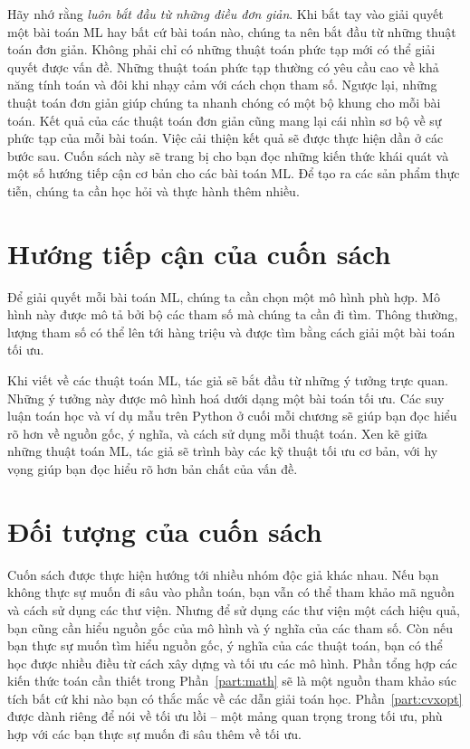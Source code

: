 Hãy nhớ rằng \textit{luôn bắt đầu từ những điều đơn giản}. Khi bắt tay vào giải
quyết một bài toán ML hay bất cứ bài toán nào, chúng ta nên bắt đầu từ những
thuật toán đơn giản. Không phải chỉ có những thuật toán phức tạp mới có thể
giải quyết được vấn đề. Những thuật toán phức tạp thường có yêu cầu cao về khả
năng tính toán và đôi khi nhạy cảm với cách chọn tham số. Ngược lại, những
thuật toán đơn giản giúp chúng ta nhanh chóng có một bộ khung cho mỗi bài
toán. Kết quả của các thuật toán đơn giản cũng mang lại cái nhìn sơ bộ về sự
phức tạp của mỗi bài toán. Việc cải thiện kết quả sẽ được thực hiện dần ở các
bước sau. Cuốn sách này sẽ trang bị cho bạn đọc những kiến thức khái quát và một
số hướng tiếp cận cơ bản cho các bài toán ML. Để tạo ra các sản phẩm thực tiễn,
chúng ta cần học hỏi và thực hành thêm nhiều.


\section{Hướng tiếp cận của cuốn sách}

Để giải quyết mỗi bài toán ML, chúng ta cần chọn một mô hình phù hợp. Mô hình
này được mô tả bởi bộ các tham số mà chúng ta cần đi tìm. Thông thường, lượng
tham số có thể lên tới hàng triệu và được tìm bằng cách giải một bài toán tối
ưu.

Khi viết về các thuật toán ML, tác giả sẽ bắt đầu từ những ý tưởng trực quan.
Những ý tưởng này được mô hình hoá dưới dạng một bài toán tối ưu. Các suy luận
toán học và ví dụ mẫu trên Python ở cuối mỗi chương sẽ giúp bạn đọc hiểu rõ hơn
về nguồn gốc, ý nghĩa, và cách sử dụng mỗi thuật toán. Xen kẽ giữa những thuật
toán ML, tác giả sẽ trình bày các kỹ thuật tối ưu cơ bản, với hy vọng giúp bạn
đọc hiểu rõ hơn bản chất của vấn đề.
\section{Đối tượng của cuốn sách}
Cuốn sách được thực hiện hướng tới nhiều nhóm độc giả khác nhau. Nếu bạn không
thực sự muốn đi sâu vào phần toán, bạn vẫn có thể tham khảo mã nguồn và cách sử
dụng các thư viện. Nhưng để sử dụng các thư viện một cách hiệu quả, bạn cũng cần
hiểu nguồn gốc của mô hình và ý nghĩa của các tham số. Còn nếu bạn thực sự muốn
tìm hiểu nguồn gốc, ý nghĩa của các thuật toán, bạn có thể học được nhiều điều
từ cách xây dựng và tối ưu các mô hình. Phần tổng hợp các kiến thức toán cần
thiết trong Phần~\ref{part:math} sẽ là một nguồn tham khảo súc tích bất cứ khi
nào bạn có thắc mắc về các dẫn giải toán học. Phần~\ref{part:cvxopt} được dành
riêng để nói về tối ưu lồi -- một mảng quan trọng trong tối ưu, phù hợp với các
bạn thực sự muốn đi sâu thêm về tối ưu.

